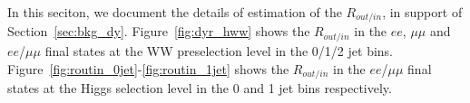 In this seciton, we document the details of estimation of the $R_{out/in}$, 
in support of Section~\ref{sec:bkg_dy}. 
Figure~\ref{fig:dyr_hww} shows the $R_{out/in}$ in the $ee$, $\mu\mu$ 
and $ee$/$\mu\mu$ final states at the WW preselection level in 
the 0/1/2 jet bins. 
Figure~\ref{fig:routin_0jet}-\ref{fig:routin_1jet} shows the $R_{out/in}$ in the 
$ee$/$\mu\mu$ final states at the Higgs selection level in the 
0 and 1 jet bins respectively. 

\begin{figure}[!hbtp]

\centering
{}

\end{figure}
